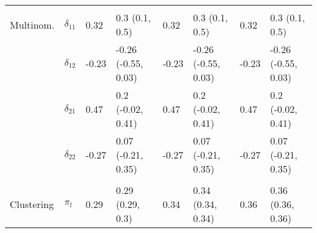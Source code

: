 \documentclass[]{article}
\begin{document}
\begin{table}[t]
\begin{tabular}{llllllll}
\addlinespace[0.3em]
\multicolumn{8}{l}{\textbf{ }}\\
\hspace{1em}Multinom. & $\delta_{11}$ & 0.32 & 0.3 (0.1, 0.5) & 0.32 & 0.3 (0.1, 0.5) & 0.32 & 0.3 (0.1, 0.5)\\
\hspace{1em} & $\delta_{12}$ & -0.23 & -0.26 (-0.55, 0.03) & -0.23 & -0.26 (-0.55, 0.03) & -0.23 & -0.26 (-0.55, 0.03)\\
\hspace{1em} & $\delta_{21}$ & 0.47 & 0.2 (-0.02, 0.41) & 0.47 & 0.2 (-0.02, 0.41) & 0.47 & 0.2 (-0.02, 0.41)\\
\hspace{1em} & $\delta_{22}$ & -0.27 & 0.07 (-0.21, 0.35) & -0.27 & 0.07 (-0.21, 0.35) & -0.27 & 0.07 (-0.21, 0.35)\\
\addlinespace[0.3em]
\multicolumn{8}{l}{\textbf{ }}\\
\hspace{1em}Clustering & $\pi_l$ & 0.29 & 0.29 (0.29, 0.3) & 0.34 & 0.34 (0.34, 0.34) & 0.36 & 0.36 (0.36, 0.36)\\
\bottomrule
\end{tabular}
\end{table}
\end{document}
